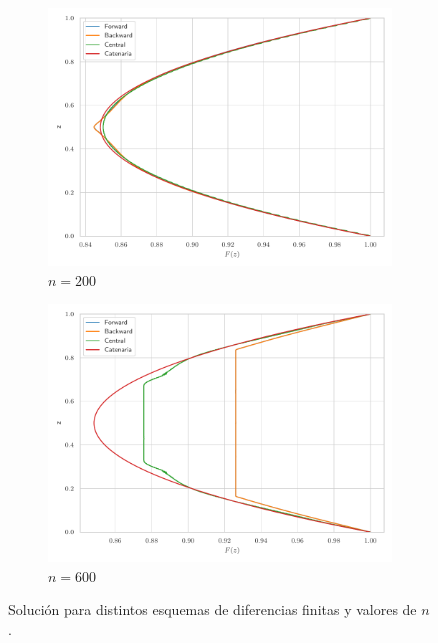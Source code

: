 \begin{figure}[h]
    \begin{subfigure}[b]{0.45\textwidth}
        \centering
        \includegraphics[width=\textwidth]{Figures/01/sol_deriv_n200.pdf}
        \caption{$n = 200$}
        \label{fig:diff_n200}
    \end{subfigure}
    \hfill
    \begin{subfigure}[b]{0.45\textwidth}
        \centering
        \includegraphics[width=\textwidth]{Figures/01/sol_deriv_n600.pdf}
        \caption{$n = 600$}
        \label{fig:diff_n600}
    \end{subfigure}
    \caption{Solución para distintos esquemas de diferencias finitas y valores de $n$.}
    \label{fig:sol_diff}
\end{figure}

